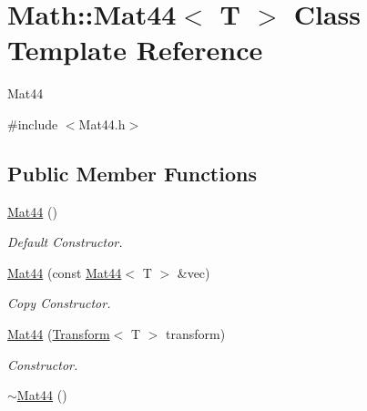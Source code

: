 \hypertarget{classMath_1_1Mat44}{
\section{Math::Mat44$<$ T $>$ Class Template Reference}
\label{classMath_1_1Mat44}
}


Mat44  


{\ttfamily \#include $<$Mat44.h$>$}\subsection*{Public Member Functions}
\begin{DoxyCompactItemize}
\item 
\hypertarget{classMath_1_1Mat44_a76d3a9e28019aaa9a149ed080a73f654}{
\hyperlink{classMath_1_1Mat44_a76d3a9e28019aaa9a149ed080a73f654}{Mat44} ()}
\label{classMath_1_1Mat44_a76d3a9e28019aaa9a149ed080a73f654}

\begin{DoxyCompactList}\small\item\em Default Constructor. \item\end{DoxyCompactList}\item 
\hypertarget{classMath_1_1Mat44_ac99957ca989283f71c26347a101ffc16}{
\hyperlink{classMath_1_1Mat44_ac99957ca989283f71c26347a101ffc16}{Mat44} (const \hyperlink{classMath_1_1Mat44}{Mat44}$<$ T $>$ \&vec)}
\label{classMath_1_1Mat44_ac99957ca989283f71c26347a101ffc16}

\begin{DoxyCompactList}\small\item\em Copy Constructor. \item\end{DoxyCompactList}\item 
\hypertarget{classMath_1_1Mat44_a81b4c8fecc029417dd1779a26920dc3e}{
\hyperlink{classMath_1_1Mat44_a81b4c8fecc029417dd1779a26920dc3e}{Mat44} (\hyperlink{classMath_1_1Transform}{Transform}$<$ T $>$ transform)}
\label{classMath_1_1Mat44_a81b4c8fecc029417dd1779a26920dc3e}

\begin{DoxyCompactList}\small\item\em Constructor. \item\end{DoxyCompactList}\item 
\hypertarget{classMath_1_1Mat44_a8175f98467aed9a45074a77a1535b92b}{
\hyperlink{classMath_1_1Mat44_a8175f98467aed9a45074a77a1535b92b}{$\sim$Mat44} ()}
\label{classMath_1_1Mat44_a8175f98467aed9a45074a77a1535b92b}


\end{DoxyCompactItemize}
